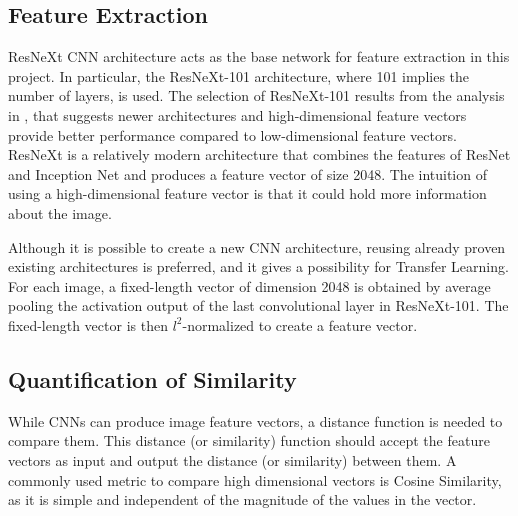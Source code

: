 \subsection{Feature Extraction}

ResNeXt CNN architecture \cite{Xie2016} acts as the base network for feature extraction in this project. In particular, the ResNeXt-101 architecture, where 101 implies the number of layers, is used. The selection of ResNeXt-101 results from the analysis in \cite{Seguin2018MakingLA}, that suggests newer architectures and high-dimensional feature vectors provide better performance compared to low-dimensional feature vectors. ResNeXt is a relatively modern architecture that combines the features of ResNet and Inception Net and produces a feature vector of size 2048. The intuition of using a high-dimensional feature vector is that it could hold more information about the image. 

Although it is possible to create a new CNN architecture, reusing already proven existing architectures is preferred, and it gives a possibility for Transfer Learning. For each image, a fixed-length vector of dimension 2048 is obtained by average pooling the activation output of the last convolutional layer in ResNeXt-101. The fixed-length vector is then \begin{math} l^2 \end{math}-normalized to create a feature vector.

\subsection{Quantification of Similarity}

While CNNs can produce image feature vectors, a distance function is needed to compare them. This distance (or similarity) function should accept the feature vectors as input and output the distance (or similarity) between them. A commonly used metric to compare high dimensional vectors is Cosine Similarity, as it is simple and independent of the magnitude of the values in the vector.

